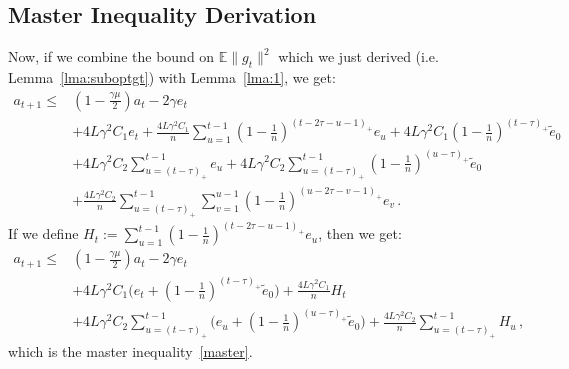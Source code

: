 \documentclass[twoside, 11pt]{article}
\newcommand{\stepsize}{\gamma}
\newcommand{\strongconvex}{\mu}
\newcommand{\overlap}{\tau}
\newcommand{\lipschitz}{L}
\newcommand{\E}{\mathbb{E}}
\begin{document}
\subsection{Master Inequality Derivation}\label{apxB:master}
Now, if we combine the bound on $\E\|g_{t}\|^2$ which we just derived (i.e. Lemma~\ref{lma:suboptgt}) with Lemma~\ref{lma:1}, we get:
\begin{equation}
\begin{aligned}
a_{t+1}
\leq &(1 - \frac{\stepsize\strongconvex}{2}) a_t
	- 2\stepsize e_t
\\
	&+ 4\lipschitz\stepsize^2 C_1e_t
	+ \frac{4\lipschitz\stepsize^2 C_1}{n} \sum_{u=1}^{t-1} (1 - \frac{1}{n})^{(t-2\overlap-u -1)_+} e_u
	+ 4\lipschitz \stepsize^2 C_1(1 - \frac{1}{n})^{(t-\overlap)_+} \tilde e_0
\\
	&+4\lipschitz\stepsize^2 C_2\sum_{u=(t-\overlap)_+}^{t-1} e_u
	+4\lipschitz\stepsize^2 C_2 \sum_{u=(t-\overlap)_+}^{t-1} (1 - \frac{1}{n})^{(u - \overlap)_+} \tilde e_0
\\
	&+ \frac{4\lipschitz\stepsize^2 C_2}{n} \sum_{u=(t-\overlap)_+}^{t-1} \sum_{v=1}^{u-1} (1-\frac{1}{n})^{(u - 2\overlap - v -1)_+}e_v  \, .
\end{aligned}
\end{equation}
If we define $H_t := \sum_{u=1}^{t-1} (1 - \frac{1}{n})^{(t-2\overlap-u-1)_+} e_u$, then we get:
\begin{equation}\label{eq:master}
\begin{aligned}
a_{t+1}
\leq &(1 - \frac{\stepsize\strongconvex}{2}) a_t
	- 2\stepsize e_t
\\
	&+ 4\lipschitz\stepsize^2 C_1 \big(e_t  + (1 - \frac{1}{n})^{(t-\overlap)_+} \tilde e_0 \big)
	+ \frac{4\lipschitz\stepsize^2 C_1}{n} H_t
\\
	&+4\lipschitz\stepsize^2 C_2\sum_{u=(t-\overlap)_+}^{t-1} (e_u +  (1 - \frac{1}{n})^{(u - \overlap)_+} \tilde e_0 \big)
	+\frac{4\lipschitz\stepsize^2 C_2}{n} \sum_{u=(t-\overlap)_+}^{t-1} H_u  \, ,
\end{aligned}
\end{equation}
which is the master inequality~\eqref{master}.
\end{document}
